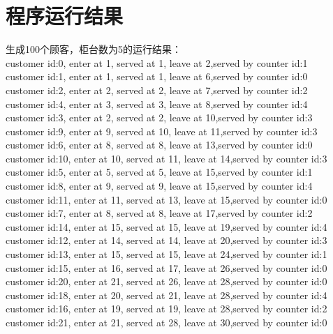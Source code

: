\documentclass[UTF8]{ctexart}
\begin{document}
\section{程序运行结果}
生成100个顾客，柜台数为5的运行结果：\\
customer id:0, enter at 1, served at 1, leave at 2,served by counter id:1
\\
customer id:1, enter at 1, served at 1, leave at 6,served by counter id:0
\\
customer id:2, enter at 2, served at 2, leave at 7,served by counter id:2
\\
customer id:4, enter at 3, served at 3, leave at 8,served by counter id:4
\\
customer id:3, enter at 2, served at 2, leave at 10,served by counter id:3
\\
customer id:9, enter at 9, served at 10, leave at 11,served by counter id:3
\\
customer id:6, enter at 8, served at 8, leave at 13,served by counter id:0
\\
customer id:10, enter at 10, served at 11, leave at 14,served by counter id:3
\\
customer id:5, enter at 5, served at 5, leave at 15,served by counter id:1
\\
customer id:8, enter at 9, served at 9, leave at 15,served by counter id:4
\\
customer id:11, enter at 11, served at 13, leave at 15,served by counter id:0
\\
customer id:7, enter at 8, served at 8, leave at 17,served by counter id:2
\\
customer id:14, enter at 15, served at 15, leave at 19,served by counter id:4
\\
customer id:12, enter at 14, served at 14, leave at 20,served by counter id:3
\\
customer id:13, enter at 15, served at 15, leave at 24,served by counter id:1
\\
customer id:15, enter at 16, served at 17, leave at 26,served by counter id:0
\\
customer id:20, enter at 21, served at 26, leave at 28,served by counter id:0
\\
customer id:18, enter at 20, served at 21, leave at 28,served by counter id:4
\\
customer id:16, enter at 19, served at 19, leave at 28,served by counter id:2
\\
customer id:21, enter at 21, served at 28, leave at 30,served by counter id:0
\end{document}
